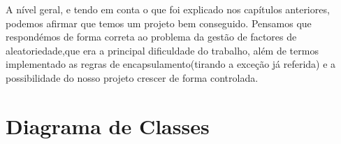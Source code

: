 \documentclass[a4paper]{report}
\begin{document}
	A nível geral, e tendo em conta o que foi explicado nos capítulos anteriores, podemos afirmar que temos um projeto bem conseguido. Pensamos que respondémos de forma correta ao problema da gestão de factores de aleatoriedade,que era a principal dificuldade do trabalho, além de termos implementado as regras de encapsulamento(tirando a exceção já referida) e a possibilidade do nosso projeto crescer de forma controlada.
	
	\appendix
	
	\chapter{Diagrama de Classes}
	
\end{document}
